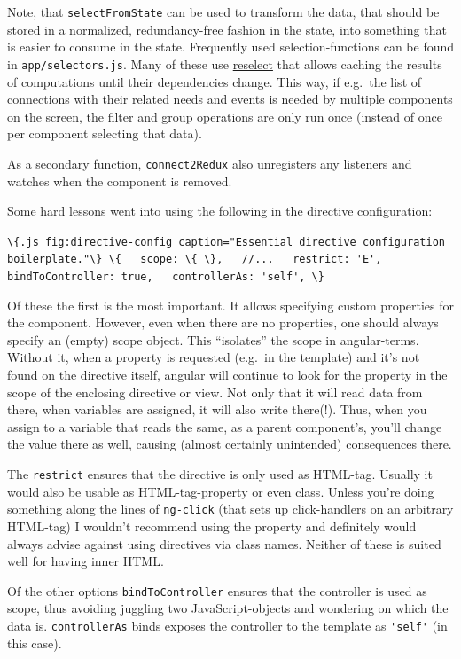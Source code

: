 \documentclass[a4paper,,tablecaptionabove]{scrbook}
\newcommand{\passthrough}[1]{#1}
\begin{document}
Note, that \passthrough{\lstinline!selectFromState!} can be used to
transform the data, that should be stored in a normalized,
redundancy-free fashion in the state, into something that is easier to
consume in the state. Frequently used selection-functions can be found
in \passthrough{\lstinline!app/selectors.js!}. Many of these use
\href{https://github.com/reactjs/reselect}{reselect} that allows caching
the results of computations until their dependencies change. This way,
if e.g.~the list of connections with their related needs and events is
needed by multiple components on the screen, the filter and group
operations are only run once (instead of once per component selecting
that data).

As a secondary function, \passthrough{\lstinline!connect2Redux!} also
unregisters any listeners and watches when the component is removed.

Some hard lessons went into using the following in the directive
configuration:

\passthrough{\lstinline!\{.js fig:directive-config caption="Essential directive configuration boilerplate."\} \{   scope: \{ \},   //...   restrict: 'E',   bindToController: true,   controllerAs: 'self', \}!}

Of these the first is the most important. It allows specifying custom
properties for the component. However, even when there are no
properties, one should always specify an (empty) scope object. This
\enquote{isolates} the scope in angular-terms. Without it, when a
property is requested (e.g.~in the template) and it's not found on the
directive itself, angular will continue to look for the property in the
scope of the enclosing directive or view. Not only that it will read
data from there, when variables are assigned, it will also write
there(!). Thus, when you assign to a variable that reads the same, as a
parent component's, you'll change the value there as well, causing
(almost certainly unintended) consequences there.

The \passthrough{\lstinline!restrict!} ensures that the directive is
only used as HTML-tag. Usually it would also be usable as
HTML-tag-property or even class. Unless you're doing something along the
lines of \passthrough{\lstinline!ng-click!} (that sets up click-handlers
on an arbitrary HTML-tag) I wouldn't recommend using the property and
definitely would always advise against using directives via class names.
Neither of these is suited well for having inner HTML.

Of the other options \passthrough{\lstinline!bindToController!} ensures
that the controller is used as scope, thus avoiding juggling two
JavaScript-objects and wondering on which the data is.
\passthrough{\lstinline!controllerAs!} binds exposes the controller to
the template as \passthrough{\lstinline!'self'!} (in this case).
\end{document}
